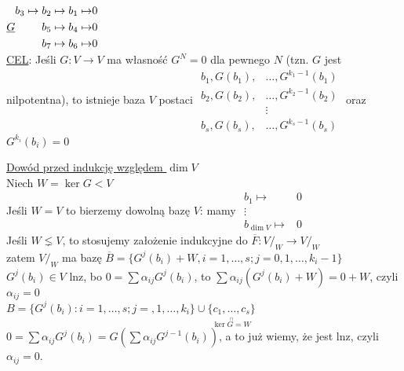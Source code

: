 \documentclass[10pt]{article}
\newcommand{\underscript}[3]{\underset{\scriptstyle{\overset{#2}{#3}}}{#1}}
\theoremstyle{definition}
\theoremstyle{definition}
\theoremstyle{definition}
\theoremstyle{definition}
\theoremstyle{remark}
\theoremstyle{definition}
\theoremstyle{definition}
\theoremstyle{definition}
\theoremstyle{definition}
\theoremstyle{definition}
\begin{document}
$\underline G \\ 
\begin{aligned} 
    b_3 \mapsto b_2 \mapsto b_1 \mapsto &0 \\ 
    b_5 \mapsto b_4 \mapsto &0 \\ 
    b_7 \mapsto b_6 \mapsto &0 
\end{aligned} $ \\ 
\underline{CEL}: Jeśli $G: V \to V$ ma własność $G^N = 0$ dla pewnego $N$ (tzn. $G$ jest nilpotentna), to 
    istnieje baza $V$ postaci $\begin{aligned} b_1, G(b_1),&\ldots,G^{k_1 -1} (b_1) \\ 
                                               b_2, G(b_2),&\ldots,G^{k_2 -1} (b_2) \\
                                                            &\vdots \\
                                               b_s, G(b_s),&\ldots,G^{k_s -1} (b_s) \end{aligned}$
    oraz $G^{k_i} (b_i) = 0$

\underline{Dowód przed indukcję względem $\dim V$} \\ 
Niech $W = \ker G < V$ \\ 
Jeśli $W = V$ to bierzemy dowolną bazę $V$: mamy 
$\begin{aligned} b_1 \mapsto &0 \\ \vdots \\ b_{\dim V} \mapsto &0 \end{aligned} $ \\ 
Jeśli $W \lneq V$, to stosujemy założenie indukcyjne do $\overline F: V/_W \to V/_W$ \\ 
zatem $V /_W$ ma bazę $\overline B = \{G^j (b_i) + W, i = 1,\ldots,s; j = 0,1,\ldots,k_i-1 \}$ \\ 
$G^j (b_i) \in V$ lnz, bo $ 0 = \sum \alpha_{ij} G^j (b_i)$, to $\sum \alpha_{ij}(G^j(b_i) + W) = 0+W$, czyli 
$\alpha_{ij} = 0$ \\ 
$B = \{ G^j (b_i) : i = 1,\ldots,s; j = ,1,\ldots,k_i \} \cup \underscript{\{c_1,\ldots,c_s\}}{\cap}{\ker G = W}$
$0 = \sum \alpha_{ij} G^j (b_i) = G( \sum \alpha_{ij} G^{j-1} (b_i))$, a to już wiemy, że jest lnz, czyli $\alpha_{ij} = 0$.
\end{document}
